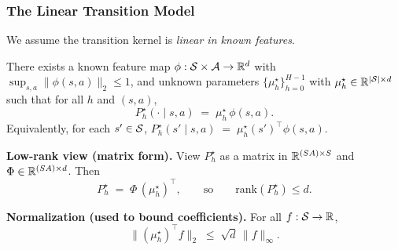 \documentclass[aspectratio=169]{beamer}
\begin{document}
\begin{frame}\frametitle{The Linear Transition Model}

We assume the transition kernel is \emph{linear in known features}.

\begin{assumption}\label{assump:linear_mdp_slides}
There exists a known feature map $\phi:\mathcal{S}\times\mathcal{A}\to\mathbb{R}^d$ with
$\sup_{s,a}\|\phi(s,a)\|_2\le 1$, and unknown parameters
$\{\mu_h^\star\}_{h=0}^{H-1}$ with $\mu_h^\star\in\mathbb{R}^{|\mathcal{S}|\times d}$ such that for all
$h$ and $(s,a)$,
\[
P_h^\star(\cdot\mid s,a) \;=\; \mu_h^\star\,\phi(s,a).
\]
Equivalently, for each $s'\in\mathcal{S}$, \alert{
$P_h^\star(s'\mid s,a) \;=\; \mu_h^\star(s')^\top \phi(s,a)$}.
\end{assumption}

\vspace{0.15cm}
\pause
\textbf{Low-rank view (matrix form).}
View $P_h^\star$ as a matrix in $\mathbb{R}^{(SA)\times S}$ and
$\Phi\in\mathbb{R}^{(SA)\times d}$. Then
\[
P_h^\star \;=\; \Phi\,(\mu_h^\star)^\top,
\qquad\text{so}\qquad \mathrm{rank}(P_h^\star)\le d.
\]

\vspace{0.15cm}
\pause
\textbf{Normalization (used to bound coefficients).}
For all $f:\mathcal{S}\to\mathbb{R}$,
\[
\big\|(\mu_h^\star)^\top f\big\|_2 \;\le\; \sqrt{d}\,\|f\|_\infty.
\]

\end{frame}
\end{document}
